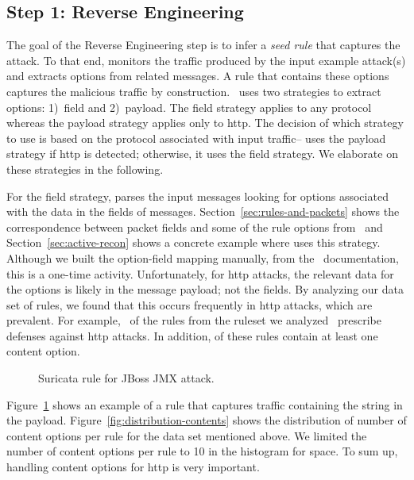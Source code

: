 \documentclass[conference]{IEEEtran}
\begin{document}
\subsection{Step 1: Reverse Engineering}
\label{sec:reverse-engineering}

The goal of the Reverse Engineering step is to infer a \emph{seed
  rule} that captures the attack. To that end, \tname{} monitors the
traffic produced by the input example attack(s) and extracts options
from related messages. A rule that contains these options captures the
malicious traffic by construction. \tname\ uses two strategies to
extract options: 1)~field and 2)~payload. The field strategy applies
to any protocol whereas the payload strategy applies only to http.
The decision of which strategy to use is based on the protocol
associated with input traffic--\tname{} uses the payload strategy if
http is detected; otherwise, it uses the field strategy. We elaborate
on these strategies in the following.

For the field strategy, \tname{} parses the input messages looking for
options associated with the data in the fields of
messages. Section~\ref{sec:rules-and-packets} shows the correspondence
between packet fields and some of the rule options from \suri\ and
Section~\ref{sec:active-recon} shows a concrete example where \tname{}
uses this strategy. Although we built the option-field mapping
manually, from the \suri\ documentation, this is a one-time activity.
Unfortunately, for http attacks, the relevant data for the options is
likely in the message payload; not the fields. By analyzing our data
set of rules, we found that this occurs frequently in http attacks,
which are prevalent. For example, \percHttp\ of the \numrulessuri{}
rules from the ruleset we analyzed~\cite{emerging-threats-open}
prescribe defenses against http attacks. In addition,
\percRulesWithContent{} of these rules contain at least one content
option.

\begin{figure}[h!]
  
  \vspace{-1ex}  
  \caption{Suricata rule for JBoss JMX attack.}
  \vspace{-2ex}  
  \label{fig:adaptor-golden-rule.suricata}
\end{figure}

Figure~\ref{fig:adaptor-golden-rule.suricata} shows an example of a rule that
captures traffic containing the string  in the
payload.  Figure~\ref{fig:distribution-contents} shows the
distribution of number of content options per rule for the data set
mentioned above. We limited the number of content options per rule to
10 in the histogram for space.   To sum up, handling
content options for http is very important.
\end{document}
